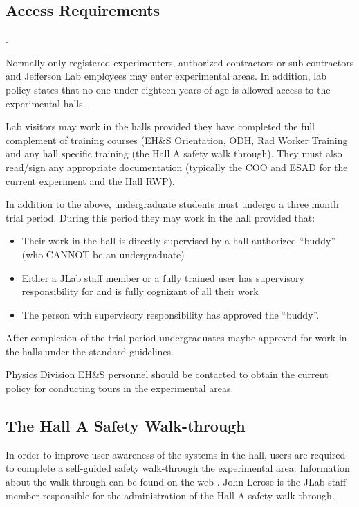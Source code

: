 \begin{safetyen}{10}{10}
\subsection{Access Requirements}.
\end{safetyen}

  Normally only registered experimenters, authorized contractors or
sub-contractors and Jefferson Lab employees may enter experimental
areas. In addition, lab policy states that no one under eighteen years
of age is allowed access to the experimental halls.

 Lab visitors may work in the halls provided they have completed the
 full complement of training courses (EH\&S Orientation, ODH, Rad
 Worker Training and any hall specific training (the Hall A safety
 walk through). They must also read/sign any appropriate documentation
 (typically the COO and ESAD for the current experiment and the Hall
 RWP).

 In addition to the above, undergraduate students must undergo a three
 month trial period. During this period they may work in the hall
 provided that:

\begin{itemize}
\item Their work in the hall is directly supervised by a hall
 authorized ``buddy'' (who CANNOT be an undergraduate)
\item Either a JLab staff member or a fully trained user has
 supervisory responsibility for and is fully cognizant of all their
 work
\item The person with supervisory responsibility has approved the
``buddy''.
\end{itemize}

After completion of the trial period undergraduates maybe
approved for work in the halls under the standard guidelines. 

Physics Division EH\&S personnel should be contacted to obtain
the current policy for conducting tours in the experimental areas. 

\begin{safetyen}{10}{10}
\subsection{The Hall A Safety Walk-through}
\end{safetyen}

In order to improve user awareness of the systems in the hall,
users are required to complete a self-guided safety walk-through
the experimental area. Information about the walk-through can be
found on the web%
.
John Lerose is the JLab staff member responsible for the
administration of the Hall A safety walk-through.

